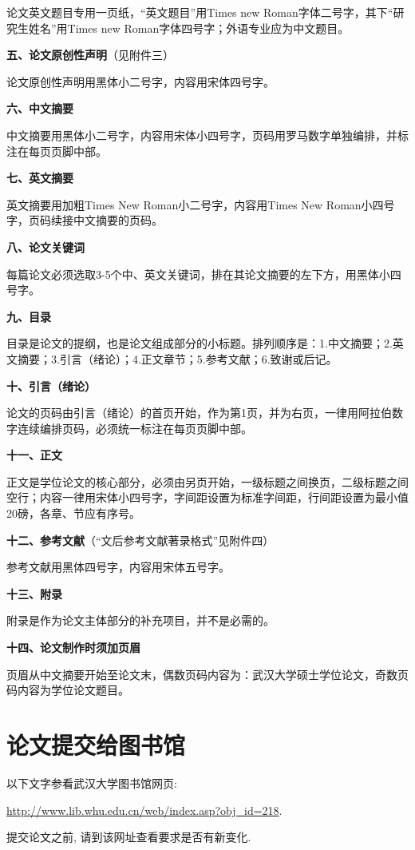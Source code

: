 \documentclass{WHUMaster}   %
\begin{document}
论文英文题目专用一页纸，“英文题目”用Times new Roman字体二号字，其下“研究生姓名”用Times new Roman字体四号字；外语专业应为中文题目。

\textbf{五、论文原创性声明}（见附件三）

论文原创性声明用黑体小二号字，内容用宋体四号字。

\textbf{六、中文摘要}

中文摘要用黑体小二号字，内容用宋体小四号字，页码用罗马数字单独编排，并标注在每页页脚中部。

\textbf{七、英文摘要}

英文摘要用加粗Times New Roman小二号字，内容用Times New Roman小四号字，页码续接中文摘要的页码。

\textbf{八、论文关键词}

每篇论文必须选取3-5个中、英文关键词，排在其论文摘要的左下方，用黑体小四号字。

\textbf{九、目录}

目录是论文的提纲，也是论文组成部分的小标题。排列顺序是：1.中文摘要；2.英文摘要；3.引言（绪论）；4.正文章节；5.参考文献；6.致谢或后记。

\textbf{十、引言（绪论）}

论文的页码由引言（绪论）的首页开始，作为第1页，并为右页，一律用阿拉伯数字连续编排页码，必须统一标注在每页页脚中部。

\textbf{十一、正文}

正文是学位论文的核心部分，必须由另页开始，一级标题之间换页，二级标题之间空行；内容一律用宋体小四号字，字间距设置为标准字间距，行间距设置为最小值20磅，各章、节应有序号。

\textbf{十二、参考文献}（“文后参考文献著录格式”见附件四）

参考文献用黑体四号字，内容用宋体五号字。

\textbf{十三、附录}

附录是作为论文主体部分的补充项目，并不是必需的。



\textbf{十四、论文制作时须加页眉}


页眉从中文摘要开始至论文末，偶数页码内容为：武汉大学硕士学位论文，奇数页码内容为学位论文题目。



\chapter{论文提交给图书馆}


{\kaishu 以下文字参看武汉大学图书馆网页:
 \begin{center}
 \url{http://www.lib.whu.edu.cn/web/index.asp?obj_id=218}.
 \end{center}
 提交论文之前, 请到该网址查看要求是否有新变化.}
\end{document}
